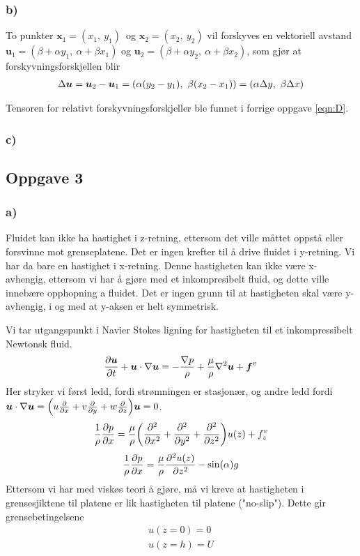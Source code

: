 \documentclass[12p,a4paper]{article}
\renewcommand{\b}{\boldsymbol}
\begin{document}
\subsubsection*{b)}
To punkter $\b x_1 = (x_1,\ y_1)$ og $\b x_2 = (x_2,\ y_2)$ vil forskyves en vektoriell avstand $\b u_1 = (\beta + \alpha y_1,\ \alpha + \beta x_1)$ og $\b u_2 = (\beta + \alpha y_2,\ \alpha + \beta x_2)$, som gjør at forskyvningsforskjellen blir
\begin{align*}
    \Delta \b u = \b u_2 - \b u_1 = \qty(\alpha (y_2 - y_1),\ \beta (x_2 - x_1)) = \qty(\alpha\Delta y,\ \beta\Delta x)
\end{align*}

Tensoren for relativt forskyvningsforskjeller ble funnet i forrige oppgave \ref{eqn:D}.


\subsubsection*{c)}


\subsection*{Oppgave 3}
\subsubsection*{a)}
Fluidet kan ikke ha hastighet i z-retning, ettersom det ville måttet oppstå eller forsvinne mot grenseplatene. Det er ingen krefter til å drive fluidet i y-retning. Vi har da bare en hastighet i x-retning. Denne hastigheten kan ikke være x-avhengig, ettersom vi har å gjøre med et inkompresibelt fluid, og dette ville innebære opphopning a fluidet. Det er ingen grunn til at hastigheten skal være y-avhengig, i og med at y-aksen er helt symmetrisk.

Vi tar utgangspunkt i Navier Stokes ligning for hastigheten til et inkompressibelt Newtonsk fluid.
\begin{align*}
    \pdv{\b u}{t} + \b u\cdot\nabla\b u =-\frac{\nabla p}{\rho} + \frac{\mu}{\rho}\nabla^2\b u + \b f^v
\end{align*}
Her stryker vi først ledd, fordi strømningen er stasjonær, og andre ledd fordi $\b u \cdot \nabla \b u = \qty(u\pdv{x} + v\pdv{y} + w\pdv{z})\b u = 0$.
\begin{gather*}
    \frac{1}{\rho}\pdv{p}{x} = \frac{\mu}{\rho}\qty(\pdv[2]{x}+\pdv[2]{y}+\pdv[2]{z}) u(z) + f_z^v
\end{gather*}
\begin{gather}\label{eqn:NS}
    \frac{1}{\rho}\pdv{p}{x} = \frac{\mu}{\rho}\pdv[2]{u(z)}{z} - \sin(\alpha) g
\end{gather}
Ettersom vi har med viskøs teori å gjøre, må vi kreve at hastigheten i grensesjiktene til platene er lik hastigheten til platene ("no-slip"). Dette gir grensebetingelsene
\begin{gather*}
    u(z=0) = 0 \\
    u(z=h) = U
\end{gather*}
\end{document}
